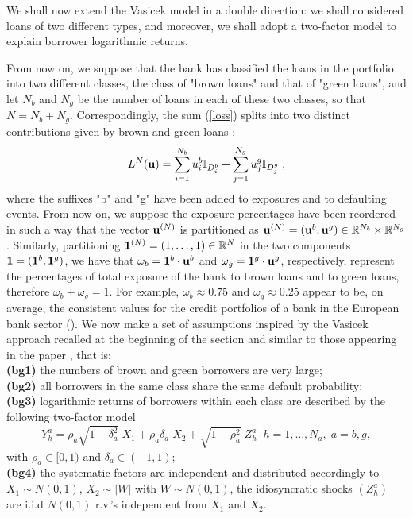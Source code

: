 \documentclass[preprint,12pt]{article}
\begin{document}
We shall now extend the Vasicek model in a double direction: we shall considered loans of two different types, and moreover, we shall adopt a two-factor model to explain borrower logarithmic returns.

From now on, we suppose that the bank has classified the loans in the portfolio into two different classes, the class of "brown loans" and that of "green loans", and let $N_b$ and $N_g$ be the number of loans in each of these two classes, so that $N=N_b+N_g$. Correspondingly, the sum (\ref{loss}) splits  into two distinct contributions given by brown and green loans :
\begin{equation} \label{g_b_Loss}
L^N({\bf{u}})  = \sum_{i=1}^{N_b} u^b_i \mathbb{I}_{D^b_i}+\sum_{j=1}^{N_g} u^g_j \mathbb{I}_{D^g_j}\;,
\end{equation}
where the suffixes "b" and "g" have been added to exposures and to defaulting events. From now on, we suppose the exposure percentages have been reordered in such a way that the vector ${\bf{u}}^{(N)}$ is partitioned as ${\bf{u}}^{(N)}=({\bf{u}}^b,{\bf{u}}^g)\in \mathbb{R}^{N_b}\times\mathbb{R}^{N_g}$. Similarly, partitioning ${\bf{1}}^{(N)}
=(1,\ldots,1)\in \mathbb{R}^N$  in the two components ${\bf{1}}=({\bf{1}}^b,{\bf{1}}^g)$, we have that
$\omega_b={\bf{1}}^b\cdot {\bf{u}}^b$ and $\omega_g={\bf{1}}^g\cdot { \bf{u}}^g$, respectively, represent the percentages of total exposure of the bank to brown loans and to green loans, therefore $\omega_b+\omega_g=1$. For example, $\omega_b\approx 0.75$ and $\omega_g\approx 0.25$ appear to be, on average, the consistent values for the credit portfolios of a bank in the European bank sector (\cite{FC2023}). We now make a set of assumptions inspired by the Vasicek approach recalled at the beginning of the section and similar to those appearing in the paper \cite{agl21}, that is:\\

\noindent
 {\bf{(bg1)}} the numbers of brown and green borrowers are very large;\\
 {\bf{(bg2)}} all borrowers in the same class share the same default probability;\\
 {\bf{(bg3)}} logarithmic returns of borrowers within each class are described by  the following two-factor model
\begin{equation}\label{basic}
Y^a_h=\rho_a\sqrt{1-\delta_a^2}\;X_1 +\rho_a\delta_a\; X_2+\sqrt{1-\rho_a^2}\;Z^a_{h}\;\;h=1,\ldots,N_a,\;a=b,g,
\end{equation}
with $\rho_a \in[0,1)$ and $\delta_a \in (-1,1)$;\\
 {\bf{(bg4)}} the systematic factors are independent and distributed accordingly to  $X_1\sim N(0,1)$, $X_2\sim |W|$ with $W\sim N(0,1)$, the  idiosyncratic shocks $(Z^a_h)$ are i.i.d  $N(0,1)$ r.v.'s independent from $X_1$ and $X_2$.\\ 
 
\end{document}
